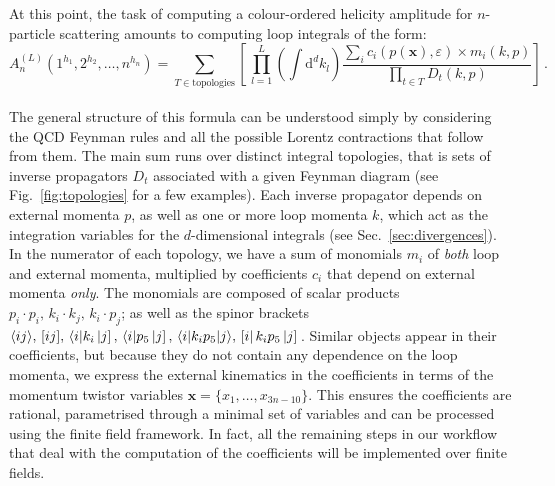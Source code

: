 \documentclass[main.tex]{subfiles}
\begin{document}
At this point, the task of computing a colour-ordered helicity amplitude for $n$-particle scattering amounts to computing loop integrals of the form:
\begin{equation} \label{eq:ampschematic}
    	A_n^{(L)} \left(1^{h_1}, 2^{h_2}, \ldots, n^{h_n} \right) =  \sum_{T\in \text{topologies}} \left[\, \prod_{l=1}^{L} \left(\int \mathrm{d}^d k_l \right) \frac{\sum_i c_i(p(\mathbf{x}), \varepsilon )\times m_i(k,p)}{\prod_{t\in T} D_t(k,p)} \right]\,.
\end{equation}
\\
The general structure of this formula can be understood simply by considering the QCD Feynman rules and all the possible Lorentz contractions that follow from them. The main sum runs over distinct integral topologies, that is sets of inverse propagators $D_t$ associated with a given Feynman diagram (see Fig.~\ref{fig:topologies} for a few examples). Each inverse propagator depends on external momenta $p$, as well as one or more loop momenta $k$, which act as the integration variables for the $d$-dimensional integrals (see Sec.~\ref{sec:divergences}). In the numerator of each topology, we have a sum of monomials $m_i$ of \textit{both} loop and external momenta, multiplied by coefficients $c_i$ that depend on external momenta \textit{only}. The monomials are composed of scalar products $p_i \cdot p_i,\, k_i \cdot k_j,\, k_i \cdot p_j$; as well as the spinor brackets $\langle ij \rangle,\, [ ij ],\, \langle i |k_i \left| j \right],\, \langle i |p_5 \left| j \right],\, \langle i|k_i p_5|j \rangle,\, \left[ i \right|k_i p_5 \left| j \right]\,$. Similar objects appear in their coefficients, but because they do not contain any dependence on the loop momenta, we express the external kinematics in the coefficients in terms of the momentum twistor variables $\mathbf{x} = \{x_1, \ldots, x_{3n-10}\}$. This ensures the coefficients are rational, parametrised through a minimal set of variables and can be processed using the finite field framework. In fact, all the remaining steps in our workflow that deal with the computation of the coefficients will be implemented over finite fields. 
\end{document}
